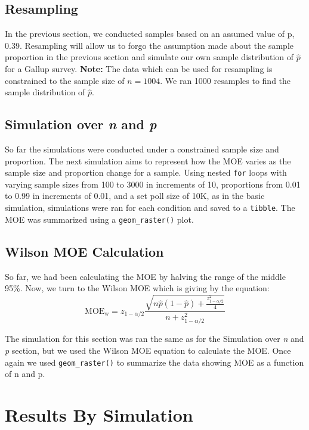 \documentclass{article}\usepackage[]{graphicx}\usepackage[]{xcolor}
\begin{document}
\begin{multicols}{2}
\subsection{Resampling}
In the previous section, we conducted samples based on an assumed value of p, 0.39. Resampling will allow us to forgo the assumption made about the sample proportion in the previous section and simulate our own sample distribution of $\hat{p}$ for a Gallup survey. \textbf{Note:} The data which can be used for resampling is constrained to the sample size of $n = 1004$. We ran 1000 resamples to find the sample distribution of $\hat{p}$.

\subsection{Simulation over \textit{n} and \textit{p}}
So far the simulations were conducted under a constrained sample size and proportion. The next simulation aims to represent how the MOE varies as the sample size and proportion change for a sample. Using nested \texttt{for} loops with varying sample sizes from 100 to 3000 in increments of 10, proportions from 0.01 to 0.99 in increments of 0.01, and a set poll size of 10K, as in the basic simulation, simulations were ran for each condition and saved to a \texttt{tibble}. The MOE was summarized using a \verb|geom_raster()| plot. 

\subsection{Wilson MOE Calculation}
So far, we had been calculating the MOE by halving the range of the middle 95\%. Now, we turn to the Wilson MOE which is giving by the equation: \[\text{MOE}_{\text{w}} = z_{1-\alpha/2}\frac{ \sqrt{n\hat{p}(1-\hat{p}) + \frac{{z^2_{1-\alpha/2}}}{4}}}{n + {z^2_{1-\alpha/2}}}\]

The simulation for this section was ran the same as for the Simulation over \textit{n} and \textit{p} section, but we used the Wilson MOE equation to calculate the MOE. Once again we used \verb|geom_raster()| to summarize the data showing MOE as a function of n and p. 

\section{Results By Simulation}

\end{multicols}
\end{document}
